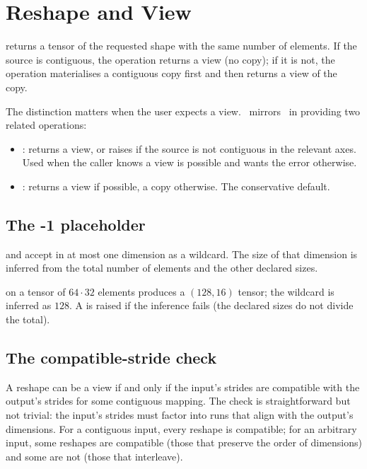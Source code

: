 \section{Reshape and View}
\label{sec:shape_view:reshape}

 returns a tensor of the requested shape
with the same number of elements. If the source is contiguous, the
operation returns a view (no copy); if it is not, the operation
materialises a contiguous copy first and then returns a view of
the copy.

The distinction matters when the user expects a view. \Lucid\
mirrors \ in providing two related operations:

\begin{itemize}
  \item {}: returns a view, or raises
     if the source is not contiguous in the
    relevant axes. Used when the caller knows a view is possible
    and wants the error otherwise.
  \item {}: returns a view if possible,
    a copy otherwise. The conservative default.
\end{itemize}

\subsection{The -1 placeholder}
\label{ssec:shape_view:minus_one}

 and  accept  in at most one
dimension as a wildcard. The size of that dimension is inferred
from the total number of elements and the other declared sizes.

 on a tensor of \(64 \cdot 32\) elements
produces a \((128, 16)\) tensor; the wildcard is inferred as
\(128\). A  is raised if the inference fails (the
declared sizes do not divide the total).

\subsection{The compatible-stride check}
\label{ssec:shape_view:stride_check}

A reshape can be a view if and only if the input's strides are
compatible with the output's strides for some contiguous mapping.
The check is straightforward but not trivial: the input's strides
must factor into runs that align with the output's dimensions. For
a contiguous input, every reshape is compatible; for an arbitrary
input, some reshapes are compatible (those that preserve the
order of dimensions) and some are not (those that interleave).

